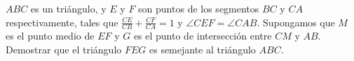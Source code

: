 $ABC$ es un triángulo, y $E$ y $F$ son puntos de los segmentos $BC$ y $CA$ respectivamente, tales que $\frac{CE}{CB}+\frac{CF}{CA}=1$ y $\angle CEF=\angle CAB$. Supongamos que $M$ es el punto medio de $EF$ y $G$ es el punto de intersección entre $CM$ y $AB$. Demostrar que el triángulo $FEG$ es semejante al triángulo $ABC$.
